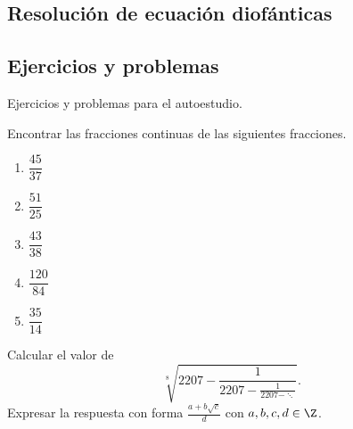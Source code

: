 \subsection{Resolución de ecuación diofánticas}



\subsection{Ejercicios y problemas}

Ejercicios y problemas para el autoestudio.

\begin{exercise}
    Encontrar las fracciones continuas de las siguientes fracciones.
    \begin{multicols}{3}
        \begin{enumerate}
            \item $\dfrac{45}{37}$
            \item $\dfrac{51}{25}$
            \item $\dfrac{43}{38}$
            \item $\dfrac{120}{84}$
            \item $\dfrac{35}{14}$
        \end{enumerate}
    \end{multicols}
\end{exercise}

\begin{problem}
    Calcular el valor de
    \[
        \sqrt[8]{2207 - \frac{1}{2207 - \frac{1}{2207 - \ddots}}}.
    \]
    Expresar la respuesta con forma $\frac{a + b\sqrt{c}}{d}$ con $a,b,c,d \in \Z$.
\end{problem}